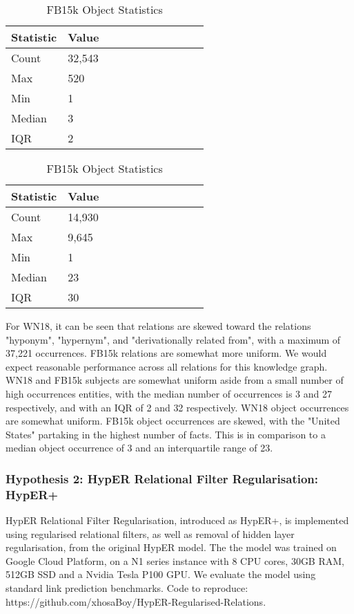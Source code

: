 \begin{table}[H]
	\parbox{.5\linewidth}{
		\caption{WN18 Object Statistics}
		\centering
		\begin{tabular}{lllllllllll}
  			\textbf{Statistic} & \textbf{Value}  \\
  			\hline
			Count & 32,543 \\
			Max & 520 \\
			Min & 1 \\
  			Median & 3 \\
  			IQR & 2 \\
		\end{tabular}
		}
	\hfill
	\parbox{.5\linewidth}{
		\caption{FB15k Object Statistics}
		\centering
		\begin{tabular}{lllllllllll}
  			\textbf{Statistic} & \textbf{Value}  \\
  			\hline
			Count & 14,930 \\
			Max & 9,645 \\
			Min & 1 \\
  			Median & 23 \\
  			IQR & 30 \\
		\end{tabular}
		}
\end{table}

For WN18, it can be seen that relations are skewed toward the relations "hyponym",  "hypernym", and "derivationally related from", with a maximum of 37,221 occurrences. \newline
FB15k relations are somewhat more uniform. We would expect reasonable performance across all relations for this knowledge graph. \newline
WN18 and FB15k subjects are somewhat uniform aside from a small number of high occurrences entities, with the median number of occurrences is 3 and 27 respectively, and with an IQR of 2 and 32 respectively. 
WN18 object occurrences are somewhat uniform. FB15k object occurrences are skewed, with the "United States" partaking in the highest number of facts. This is in comparison to a median object occurrence of 3 and an interquartile range of 23.


\subsubsection{Hypothesis 2: \newline 
HypER Relational Filter Regularisation: HypER+}
HypER Relational Filter Regularisation, introduced as HypER+, is implemented using regularised relational filters, as well as removal of hidden layer regularisation, from the original HypER model. \newline
The the model was trained on Google Cloud Platform, on a N1 series instance with  8 CPU cores, 30GB RAM, 512GB SSD and a Nvidia Tesla P100 GPU. \newline
We evaluate the model using standard link prediction benchmarks. \newline 
Code to reproduce: https://github.com/xhosaBoy/HypER-Regularised-Relations.

